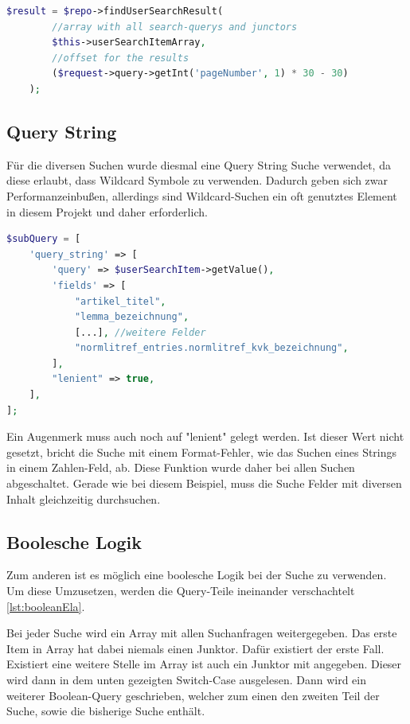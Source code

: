 \begin{lstlisting}[language=PHP, frame=single, label={lst:generierung}] 
    $result = $repo->findUserSearchResult(
        //array with all search-querys and junctors
        $this->userSearchItemArray, 
        //offset for the results
        ($request->query->getInt('pageNumber', 1) * 30 - 30)
    );
\end{lstlisting}

\subsection{Query String}
Für die diversen Suchen wurde diesmal eine Query String Suche verwendet, da diese erlaubt, dass Wildcard Symbole zu verwenden. Dadurch geben sich zwar Performanzeinbußen, allerdings sind Wildcard-Suchen ein oft genutztes Element in diesem Projekt und daher erforderlich.

\begin{lstlisting}[language=PHP, frame=single, label={lst:aufbauQueryString}] 
$subQuery = [
    'query_string' => [
        'query' => $userSearchItem->getValue(),
        'fields' => [
            "artikel_titel",
            "lemma_bezeichnung",
            [...], //weitere Felder
            "normlitref_entries.normlitref_kvk_bezeichnung",
        ],
        "lenient" => true,
    ],
];
\end{lstlisting}

Ein Augenmerk muss auch noch auf "lenient" gelegt werden. Ist dieser Wert nicht gesetzt, bricht die Suche mit einem Format-Fehler, wie das Suchen eines Strings in einem Zahlen-Feld, ab. Diese Funktion wurde daher bei allen Suchen abgeschaltet. Gerade wie bei diesem Beispiel, muss die Suche Felder mit diversen Inhalt gleichzeitig durchsuchen. 

\subsection{Boolesche Logik}

Zum anderen ist es möglich eine boolesche Logik bei der Suche zu verwenden. Um diese Umzusetzen, werden die Query-Teile ineinander verschachtelt \ref{lst:booleanEla}. 

Bei jeder Suche wird ein Array mit allen Suchanfragen weitergegeben. Das erste Item in Array hat dabei niemals einen Junktor. Dafür existiert der erste Fall. Existiert eine weitere Stelle im Array ist auch ein Junktor mit angegeben. Dieser wird dann in dem unten gezeigten Switch-Case ausgelesen. Dann wird ein weiterer Boolean-Query geschrieben, welcher zum einen den zweiten Teil der Suche, sowie die bisherige Suche enthält.

